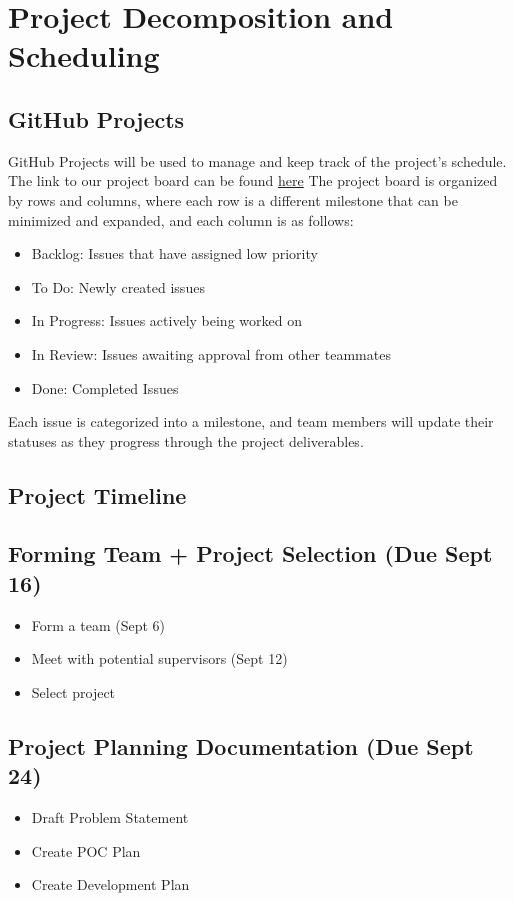 \documentclass{article}
\begin{document}
\section{Project Decomposition and Scheduling}

\subsection{GitHub Projects}

GitHub Projects will be used to manage and keep track of the project's schedule. 
The link to our project board can be found \href{https://github.com/users/parishanizam/projects/2/views/1}{here}
The project board is organized by rows and columns, where each row is a different 
milestone that can be minimized and expanded, and each column is as follows:
\begin{itemize}
  \item Backlog: Issues that have assigned low priority
  \item To Do: Newly created issues
  \item In Progress: Issues actively being worked on
  \item In Review: Issues awaiting approval from other teammates
  \item Done: Completed Issues
\end{itemize}
Each issue is categorized into a milestone, and team members will update their statuses as they 
progress through the project deliverables.

\subsection{Project Timeline}

\subsection{Forming Team + Project Selection (Due Sept 16)}
	\begin{itemize}
		\item Form a team (Sept 6)
		\item Meet with potential supervisors (Sept 12)
		\item Select project
	\end{itemize}

\subsection{Project Planning Documentation (Due Sept 24)}
	\begin{itemize}
		\item Draft Problem Statement
		\item Create POC Plan
		\item Create Development Plan
	\end{itemize}
\end{document}
